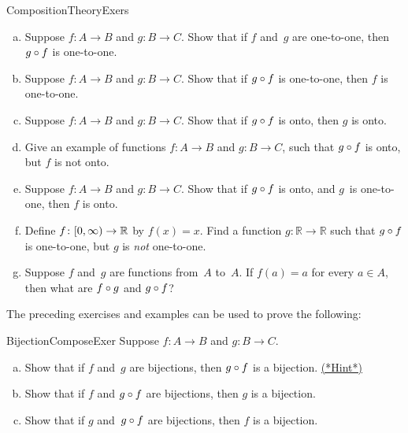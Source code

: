 \begin{exercise}{CompositionTheoryExers} \ 
\begin{enumerate}[(a)]
 \item \label{CompositionTheoryExers-gof11} 
 Suppose $f \colon A \to B$ and $g \colon B \to C$. Show that if $f$ and~$g$ are one-to-one, then $g \circ f$ is one-to-one. 
  \item \label{CompositionTheoryExers-f11} 
Suppose $f \colon A \to B$ and $g \colon B \to C$. Show that if $g \circ f$ is one-to-one, then $f$ is one-to-one.
 \item \label{CompositionTheoryExers-gonto} 
Suppose $f \colon A \to B$ and $g \colon B \to C$. Show that if $g \circ f$ is onto, then $g$ is onto.
 \item \label{CompositionTheoryExers-egNotOnto} 
Give an example of functions $f \colon A \to B$ and $g \colon B \to C$, such that $g \circ f$ is onto, but $f$ is not onto. 
 \item \label{CompositionTheoryExers-fonto} 
Suppose $f \colon A \to B$ and $g \colon B \to C$. Show that if $g \circ f$ is onto, 
 and $g$~is one-to-one, then $f$ is onto.
 \item  \label{CompositionTheoryExers-gNot11} 
Define $f \colon [0,\infty) \to \mathbb{R}$ by $f(x) = x$. Find a function $g \colon \mathbb{R} \to \mathbb{R}$ such that 
$g \circ f$ is one-to-one, but $g$ is \emph{not} one-to-one.
 \item  \label{CompositionTheoryExers-what} 
Suppose $f$ and~$g$ are functions from~$A$ to~$A$. If $f(a) = a$ for every $a \in A$, then what are $f \circ g$ and $g \circ f$?
\end{enumerate}
\end{exercise}
 
The preceding exercises and examples can be used to prove the following:

 \begin{exercise}{BijectionComposeExer}
 Suppose $f \colon A \to B$ and $g \colon B \to C$.
 \begin{enumerate}[(a)]
 \item \label{BijectionComposeExer-gf}
 Show that if $f$ and~$g$ are bijections, then $g \circ f$ is a bijection.
 \hyperref[sec:functions:hints]{(*Hint*)}
 \item  \label{BijectionComposeExer-g}
Show that if $f$ and $g\circ f$ are bijections, then $g$ is a bijection.
 \item \label{BijectionComposeExer-f}
Show that if $g$ and~$g \circ f$ are bijections, then $f$ is a bijection.
 \end{enumerate}
 \end{exercise}
 
